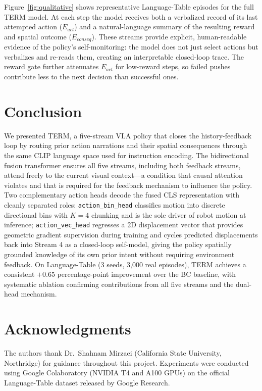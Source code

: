\documentclass[letterpaper]{article} %
\begin{document}
Figure~\ref{fig:qualitative} shows representative Language-Table episodes for the full TERM model. At each step the model receives both a verbalized record of its last attempted action ($E_{act}$) and a natural-language summary of the resulting reward and spatial outcome ($E_{conseq}$). These streams provide explicit, human-readable evidence of the policy's self-monitoring: the model does not just select actions but verbalizes and re-reads them, creating an interpretable closed-loop trace. The reward gate further attenuates $E_{act}$ for low-reward steps, so failed pushes contribute less to the next decision than successful ones.

\section{Conclusion}

We presented TERM, a five-stream VLA policy that closes the history-feedback loop by routing prior action narrations and their spatial consequences through the same CLIP language space used for instruction encoding. The bidirectional fusion transformer ensures all five streams, including both feedback streams, attend freely to the current visual context---a condition that causal attention violates and that is required for the feedback mechanism to influence the policy. Two complementary action heads decode the fused CLS representation with cleanly separated roles: \texttt{action\_bin\_head} classifies motion into discrete directional bins with $K{=}4$ chunking and is the sole driver of robot motion at inference; \texttt{action\_vec\_head} regresses a 2D displacement vector that provides geometric gradient supervision during training and cycles predicted displacements back into Stream 4 as a closed-loop self-model, giving the policy spatially grounded knowledge of its own prior intent without requiring environment feedback. On Language-Table (3 seeds, 3,000 real episodes), TERM achieves a consistent $+0.65$ percentage-point improvement over the BC baseline, with systematic ablation confirming contributions from all five streams and the dual-head mechanism.

\section*{Acknowledgments}
The authors thank Dr.\ Shahnam Mirzaei (California State University, Northridge) for guidance throughout this project. Experiments were conducted using Google Colaboratory (NVIDIA T4 and A100 GPUs) on the official Language-Table dataset released by Google Research.


\end{document}
